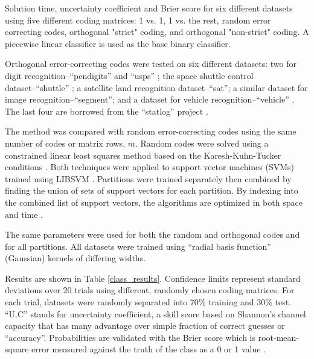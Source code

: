 \begin{table*}
\caption{Solution time, uncertainty coefficient and Brier score for six different datasets using five different coding matrices: 1 vs. 1, 1 vs. the rest, random error correcting codes, orthogonal "strict" coding, and orthogonal "non-strict" coding. A piecewise linear classifier is used as the base binary classifier.}\label{class_results_acc}

\end{table*}

Orthogonal error-correcting codes were tested on six different datasets:
two for digit recognition--``pendigits'' \citep{Alimoglu1996} and
``usps'' \citep{Hull1994}; the space shuttle control dataset--``shuttle''
\citep{King_etal1995}; a satellite land recognition
dataset--``sat''; a similar dataset for image recognition--``segment'';
and a dataset for vehicle recognition--``vehicle'' \citep{Siebert1987}.
The last four are borrowed from the ``statlog'' project \citep{King_etal1995,Michie_etal1994}.

The method was compared with random error-correcting codes using the same
number of codes or matrix rows, $m$.
Random codes were solved using a constrained linear least squares method based
on the Karesh-Kuhn-Tucker conditions \citep{Lawson_Hanson1995}.
Both techniques were applied to support vector machines (SVMs) trained using
LIBSVM \citep{Chang_Lin2011}.
Partitions were trained separately then combined by finding the union of
sets of support vectors for each partition.
By indexing into the combined list of support vectors, the algorithms are
optimized in both space and time \citep{Chang_Lin2011}.

The same parameters were used for both the random and orthogonal codes and 
for all partitions.
All datasets were trained using  ``radial basis function'' (Gaussian)
kernels of differing widths.

Results are shown in Table \ref{class_results}.
Confidence limits represent standard deviations over 20 trials using
different, randomly chosen coding matrices.
For each trial, datasets were randomly separated into 70\% training and 30\%
test.
``U.C'' stands for uncertainty
coefficient, a skill score based on Shannon's channel capacity
\citep{Shannon,Press_etal1992,Mills2011} that has many advantage over simple
fraction of correct guesses or ``accuracy''.
Probabilities are validated with the Brier score 
which is root-mean-square
error measured against the truth of the class as a 0 or 1 value
\citep{Brier1950,Jolliffe_Stephenson2003}.

